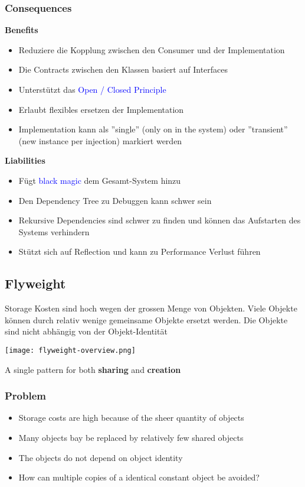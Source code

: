 \subsubsection{Consequences}
\textbf{Benefits}
\begin{itemize}
    \item Reduziere die Kopplung zwischen den Consumer und der Implementation
    \item Die Contracts zwischen den Klassen basiert auf Interfaces
    \item Unterstützt das \textcolor{blue}{Open / Closed Principle}
    \item Erlaubt flexibles ersetzen der Implementation
    \item Implementation kann als ''single'' (only on in the system) oder ''transient'' (new instance per injection) markiert werden
\end{itemize}
\vspace{10pt}
\textbf{Liabilities}
\begin{itemize}
    \item Fügt \textcolor{blue}{black magic} dem Gesamt-System hinzu
    \item Den Dependency Tree zu Debuggen kann schwer sein
    \item Rekursive Dependencies sind schwer zu finden und können das Aufstarten des Systems verhindern
    \item Stützt sich auf Reflection und kann zu Performance Verlust führen
\end{itemize}

\vfill\null
\columnbreak

\subsection{Flyweight}

Storage Kosten sind hoch wegen der grossen Menge von Objekten. Viele Objekte können durch relativ wenige gemeinsame Objekte ersetzt werden. Die Objekte sind nicht abhängig von der Objekt-Identität

\texttt{[image: flyweight-overview.png]}

A single pattern for both \textbf{sharing} and \textbf{creation}
\subsubsection{Problem}
\begin{itemize}
    \item Storage costs are high because of the sheer quantity of objects
    \item Many objects bay be replaced by relatively few shared objects
    \item The objects do not depend on object identity
    \item How can multiple copies of a identical constant object be avoided?
\end{itemize}

